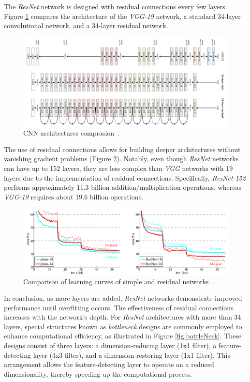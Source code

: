 The \textit{ResNet} network is designed with residual connections every few layers. Figure \ref{fig:CNNcomparision} compares the architecture of the \textit{VGG-19} network, a standard 34-layer convolutional network, and a 34-layer residual network.

\begin{figure}[!htb]
    \centering
    \includegraphics[scale=0.4]{Images/34-layers-nets-comparision.png}
    \caption{CNN architectures comprasion~\cite{DeepResidualLearning}.}
    \label{fig:CNNcomparision}
\end{figure}

The use of residual connections allows for building deeper architectures without vanishing gradient problems (Figure \ref{fig:ResNetLearningCurves}). Notably, even though \textit{ResNet} networks can have up to 152 layers, they are less complex than \textit{VGG} networks with 19 layers due to the implementation of residual connections. Specifically, \textit{ResNet-152} performs approximately $11.3$ billion addition/multiplication operations, whereas \textit{VGG-19} requires about $19.6$ billion operations.

\begin{figure}[!htb]
    \centering
    \includegraphics[scale=0.5]{Images/res-net-learning-curves.png}
    \caption{Comparison of learning curves of simple and residual networks~\cite{DeepResidualLearning}.}
    \label{fig:ResNetLearningCurves}
\end{figure}


In conclusion, as more layers are added, \textit{ResNet} networks demonstrate improved performance until overfitting occurs. The effectiveness of residual connections increases with the network's depth. For \textit{ResNet} architectures with more than 34 layers, special structures known as \textit{bottleneck} designs are commonly employed to enhance computational efficiency, as illustrated in Figure \ref{fig:bottleNeck}. These designs consist of three layers: a dimension-reducing layer (1x1 filter), a feature-detecting layer (3x3 filter), and a dimension-restoring layer (1x1 filter). This arrangement allows the feature-detecting layer to operate on a reduced dimensionality, thereby speeding up the computational process.

